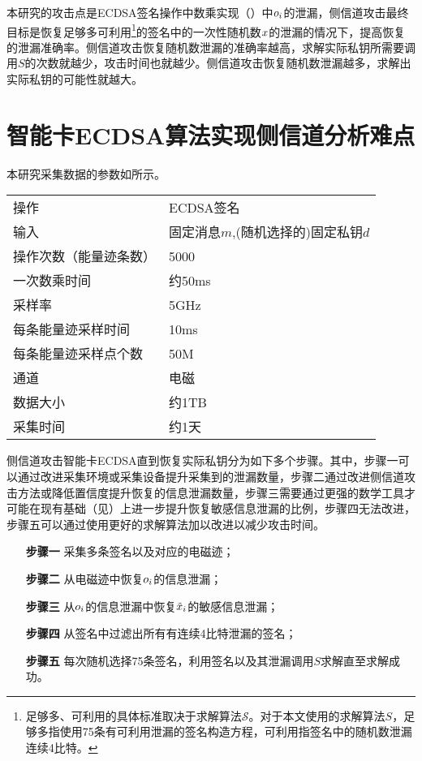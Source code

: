 {	本研究的攻击点是ECDSA签名操作中数乘实现（）中$o_i$的泄漏，侧信道攻击最终目标是恢复足够多可利用\footnote{足够多、可利用的具体标准取决于求解算法$\mathcal S$。对于本文使用的求解算法$S$，足够多指使用75条有可利用泄漏的签名构造方程，可利用指签名中的随机数泄漏连续4比特。}的签名中的一次性随机数$x$的泄漏的情况下，提高恢复的泄漏准确率。侧信道攻击恢复随机数泄漏的准确率越高，求解实际私钥所需要调用$S$的次数就越少，攻击时间也就越少。侧信道攻击恢复随机数泄漏越多，求解出实际私钥的可能性就越大。
	
	\section{智能卡ECDSA算法实现侧信道分析难点}
	本研究采集数据的参数如所示。
	
	\begin{table}[!h]
		\label{tab:acquisitionpara}
		\centering
		\begin{tabular}{ll}
			\hline
			操作 & ECDSA签名\\
			输入 & 固定消息$m$,(随机选择的)固定私钥$d$\\
			操作次数（能量迹条数） & 5000\\
			一次数乘时间 & 约50ms\\
			采样率 & 5GHz\\
			每条能量迹采样时间 & 10ms\\
			每条能量迹采样点个数 & 50M\\
			通道 & 电磁\\
			数据大小 & 约1TB\\
			采集时间 & 约1天\\
			\hline
		\end{tabular}
	\end{table}
	
	侧信道攻击智能卡ECDSA直到恢复实际私钥分为如下多个步骤。其中，步骤一可以通过改进采集环境或采集设备提升采集到的泄漏数量，步骤二通过改进侧信道攻击方法或降低置信度提升恢复的信息泄漏数量，步骤三需要通过更强的数学工具才可能在现有基础（见）上进一步提升恢复敏感信息泄漏的比例，步骤四无法改进，步骤五可以通过使用更好的求解算法加以改进以减少攻击时间。
	
	\begin{enumerate}
		\item [\textbf{步骤一}]采集多条签名以及对应的电磁迹；
		\item [\textbf{步骤二}]从电磁迹中恢复$o_i$的信息泄漏；
		\item [\textbf{步骤三}]从$o_i$的信息泄漏中恢复$\tilde {x}_i$的敏感信息泄漏；
		\item [\textbf{步骤四}]从签名中过滤出所有有连续4比特泄漏的签名；
		\item [\textbf{步骤五}]每次随机选择75条签名，利用签名以及其泄漏调用$S$求解直至求解成功。
	\end{enumerate}
	
}
